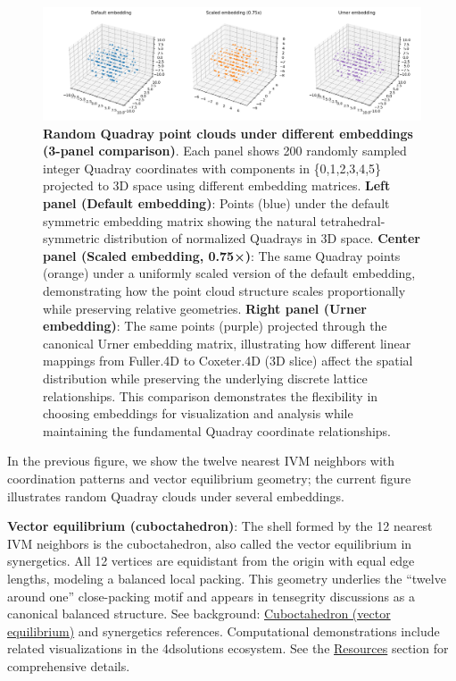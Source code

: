 \documentclass[
  10pt,
]{article}
\begin{document}
\begin{figure}
\centering
\includegraphics{../output/figures/quadray_clouds.png}
\caption{\textbf{Random Quadray point clouds under different embeddings
(3-panel comparison)}. Each panel shows 200 randomly sampled integer
Quadray coordinates with components in \{0,1,2,3,4,5\} projected to 3D
space using different embedding matrices. \textbf{Left panel (Default
embedding)}: Points (blue) under the default symmetric embedding matrix
showing the natural tetrahedral-symmetric distribution of normalized
Quadrays in 3D space. \textbf{Center panel (Scaled embedding, 0.75×)}:
The same Quadray points (orange) under a uniformly scaled version of the
default embedding, demonstrating how the point cloud structure scales
proportionally while preserving relative geometries. \textbf{Right panel
(Urner embedding)}: The same points (purple) projected through the
canonical Urner embedding matrix, illustrating how different linear
mappings from Fuller.4D to Coxeter.4D (3D slice) affect the spatial
distribution while preserving the underlying discrete lattice
relationships. This comparison demonstrates the flexibility in choosing
embeddings for visualization and analysis while maintaining the
fundamental Quadray coordinate relationships.}
\end{figure}

In the previous figure, we show the twelve nearest IVM neighbors with
coordination patterns and vector equilibrium geometry; the current
figure illustrates random Quadray clouds under several embeddings.

\textbf{Vector equilibrium (cuboctahedron)}: The shell formed by the 12
nearest IVM neighbors is the cuboctahedron, also called the vector
equilibrium in synergetics. All 12 vertices are equidistant from the
origin with equal edge lengths, modeling a balanced local packing. This
geometry underlies the ``twelve around one'' close-packing motif and
appears in tensegrity discussions as a canonical balanced structure. See
background:
\href{https://en.wikipedia.org/wiki/Cuboctahedron}{Cuboctahedron (vector
equilibrium)} and synergetics references. Computational demonstrations
include related visualizations in the 4dsolutions ecosystem. See the
\href{07_resources.md}{Resources} section for comprehensive details.
\end{document}

